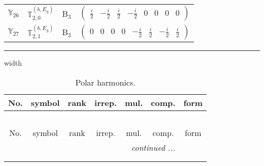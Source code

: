 \documentclass[fleqn,10pt,landscape]{article}
\begin{document}
\begin{itemize}
\begin{center}
\begin{longtable}{c|c|c|c}
$ \mathbb{Y}_{26} $ & $\mathbb{T}_{2,0}^{(b,E_{g})}$ & B$_{3}$ & $\begin{pmatrix} \frac{i}{2} & - \frac{i}{2} & \frac{i}{2} & - \frac{i}{2} & 0 & 0 & 0 & 0 \end{pmatrix}$ \\
$ \mathbb{Y}_{27} $ & $\mathbb{T}_{2,1}^{(b,E_{g})}$ & B$_{3}$ & $\begin{pmatrix} 0 & 0 & 0 & 0 & - \frac{i}{2} & \frac{i}{2} & - \frac{i}{2} & \frac{i}{2} \end{pmatrix}$ \\
\end{longtable}
\end{center}

 \hfil \hrule height 1mm width \textwidth \hfil

\begin{center}
\renewcommand{\arraystretch}{1.3}
\begin{longtable}{ccccccc}
\caption{Polar harmonics.}
 \\
 \hline \hline
No. & symbol & rank & irrep. & mul. & comp. & form \\ \hline \endfirsthead

\multicolumn{6}{l}{\tablename\ \thetable{}} \\
 \hline \hline
No. & symbol & rank & irrep. & mul. & comp. & form \\ \hline \endhead

 \hline \hline
\multicolumn{6}{r}{\footnotesize\it continued ...} \\ \endfoot

 \hline \hline
\multicolumn{6}{r}{} \\ \endlastfoot


\end{longtable}
\end{center}
\end{itemize}
\end{document}

